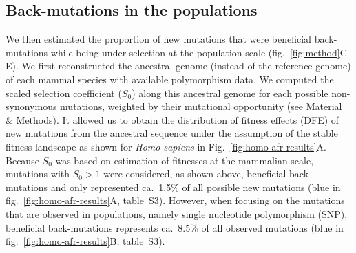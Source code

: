 \documentclass{article}
\newcommand{\Sphy}{S_{0}}
\begin{document}
    \subsection*{Back-mutations in the populations}
    We then estimated the proportion of new mutations that were beneficial back-mutations while being under selection at the population scale (fig.~\ref{fig:method}C-E).
    We first reconstructed the ancestral genome (instead of the reference genome) of each mammal species with available polymorphism data.
    We computed the scaled selection coefficient ($\Sphy$) along this ancestral genome for each possible non-synonymous mutations, weighted by their mutational opportunity (see Material \& Methods).
    It allowed us to obtain the distribution of fitness effects (DFE) of new mutations from the ancestral sequence under the assumption of the stable fitness landscape as shown for \textit{Homo sapiens} in Fig.~\ref{fig:homo-afr-results}A.
    Because $\Sphy$ was based on estimation of fitnesses at the mammalian scale, mutations with $\Sphy>1$ were considered, as shown above, beneficial back-mutations and only represented ca.~1.5\% of all possible new mutations (blue in fig.~\ref{fig:homo-afr-results}A, table~S3).
    However, when focusing on the mutations that are observed in populations, namely single nucleotide polymorphism (SNP), beneficial back-mutations represents ca.~8.5\% of all observed mutations (blue in fig.~\ref{fig:homo-afr-results}B, table~S3).
\end{document}
